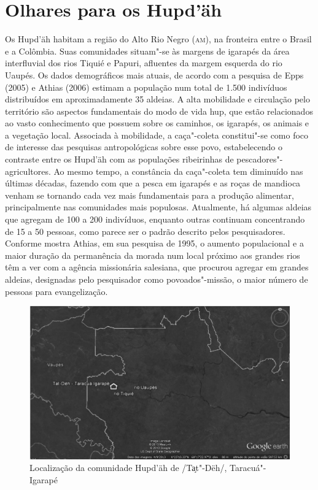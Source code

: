 \section{Olhares para os Hupd'äh}\label{olhares-para-os-hupduxe4h}

Os Hupd'äh habitam a região do Alto Rio Negro (\textsc{am}), na fronteira entre o
Brasil e a Colômbia. Suas comunidades situam"-se às margens de igarapés
da área interfluvial dos rios Tiquié e Papuri, afluentes da margem
esquerda do rio Uaupés. Os dados demográficos mais atuais, de acordo com
a pesquisa de Epps (2005) e Athias (2006) estimam a população num total
de 1.500 indivíduos distribuídos em aproximadamente 35 aldeias. A alta
mobilidade e circulação pelo território são aspectos fundamentais do
modo de vida hup, que estão relacionados ao vasto conhecimento que
possuem sobre os caminhos, os igarapés, os animais e a vegetação local.
Associada à mobilidade, a caça"-coleta constitui"-se como foco de
interesse das pesquisas antropológicas sobre esse povo, estabelecendo o
contraste entre os Hupd'äh com as populações ribeirinhas de
pescadores"-agricultores. Ao mesmo tempo, a constância da caça"-coleta tem
diminuído nas últimas décadas, fazendo com que a pesca em igarapés e as
roças de mandioca venham se tornando cada vez mais fundamentais para a
produção alimentar, principalmente nas comunidades mais populosas.
Atualmente, há algumas aldeias que agregam de 100 a 200 indivíduos,
enquanto outras continuam concentrando de 15 a 50 pessoas, como parece
ser o padrão descrito pelos pesquisadores. Conforme mostra Athias, em
sua pesquisa de 1995, o aumento populacional e a maior duração da
permanência da morada num local próximo aos grandes rios têm a ver com a
agência missionária salesiana, que procurou agregar em grandes aldeias,
designadas pelo pesquisador como povoados"-missão, o maior número de
pessoas para evangelização.

\begin{figure}
\centering
\includegraphics[width=\textwidth]{./img/003}
\caption{Localização da comunidade Hupd'äh de /Ta̗t"-Dëh/,
Taracuá"-Igarapé}
\end{figure}

